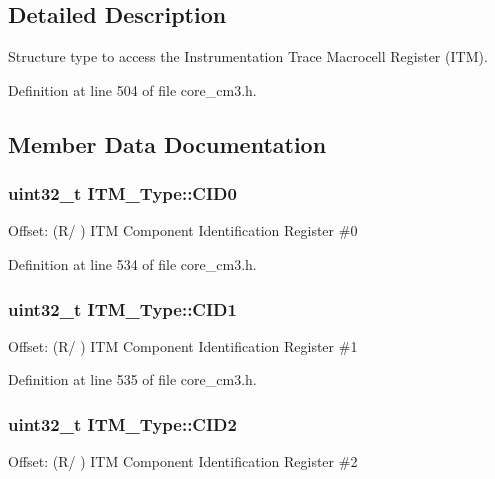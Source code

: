 \subsection{\-Detailed \-Description}
\-Structure type to access the \-Instrumentation \-Trace \-Macrocell \-Register (\-I\-T\-M). 

\-Definition at line 504 of file core\-\_\-cm3.\-h.



\subsection{\-Member \-Data \-Documentation}
\hypertarget{struct_i_t_m___type_a413f3bb0a15222e5f38fca4baeef14f6}{
\subsubsection[{\-C\-I\-D0}]{ uint32\-\_\-t {\bf \-I\-T\-M\-\_\-\-Type\-::\-C\-I\-D0}}}\label{struct_i_t_m___type_a413f3bb0a15222e5f38fca4baeef14f6}
\-Offset\-: (\-R/ ) \-I\-T\-M \-Component \-Identification \-Register \#0 

\-Definition at line 534 of file core\-\_\-cm3.\-h.

\hypertarget{struct_i_t_m___type_a5f7d524b71f49e444ff0d1d52b3c3565}{
\subsubsection[{\-C\-I\-D1}]{ uint32\-\_\-t {\bf \-I\-T\-M\-\_\-\-Type\-::\-C\-I\-D1}}}\label{struct_i_t_m___type_a5f7d524b71f49e444ff0d1d52b3c3565}
\-Offset\-: (\-R/ ) \-I\-T\-M \-Component \-Identification \-Register \#1 

\-Definition at line 535 of file core\-\_\-cm3.\-h.

\hypertarget{struct_i_t_m___type_adee4ccce1429db8b5db3809c4539f876}{
\subsubsection[{\-C\-I\-D2}]{ uint32\-\_\-t {\bf \-I\-T\-M\-\_\-\-Type\-::\-C\-I\-D2}}}\label{struct_i_t_m___type_adee4ccce1429db8b5db3809c4539f876}
\-Offset\-: (\-R/ ) \-I\-T\-M \-Component \-Identification \-Register \#2 

